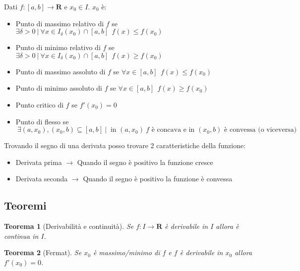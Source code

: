 \documentclass{article}
\newtheorem{theorem}{Teorema}
\begin{document}
\noindent Dati $f:[a,b]\rightarrow\mathbf{R}$ e $x_0\in I$. $x_0$ è:
\begin{itemize}
    \item Punto di massimo relativo di $f$ se $\exists\delta>0\ |\ \forall x\in I_\delta(x_0)\cap[a,b]\ \ f(x)\leq f(x_0)$
    
    \item Punto di minimo relativo di $f$ se $\exists\delta>0\ |\ \forall x\in I_\delta(x_0)\cap[a,b]\ \ f(x)\geq f(x_0)$

    \item Punto di massimo assoluto di $f$ se $\forall x\in[a,b]\ \ f(x)\leq f(x_0)$

    \item Punto di minimo assoluto di $f$ se $\forall x\in[a,b]\ \ f(x)\geq f(x_0)$

    \item Punto critico di $f$ se $f'(x_0)=0$

    \item Punto di flesso se $\ \exists(a,x_0),(x_0,b)\subseteq[a,b]\ |\ \text{ in $(a,x_0)\ f$ è concava e in $(x_0,b)$ è convessa (o viceversa)}$\newline
    
\end{itemize}

\noindent Trovando il segno di una derivata posso trovare 2 caratteristiche della funzione:
    \begin{itemize}
        \item Derivata prima $\rightarrow$ Quando il segno è positivo la funzione cresce
        \item Derivata seconda $\rightarrow$ Quando il segno è positivo la funzione è convessa
    \end{itemize}

\newpage

\subsection{Teoremi}

\begin{theorem}[Derivabilità e continuità]
    Se $f:I\rightarrow\mathbf{R}$ è derivabile in $I$ allora è continua in $I$.\newline
\end{theorem}

\begin{theorem}[Fermat]
    Se $x_0$ è massimo/minimo di $f$ e $f$ è derivabile in $x_0$ allora $f'(x_0)=0$.\newline
\end{theorem}
\end{document}
